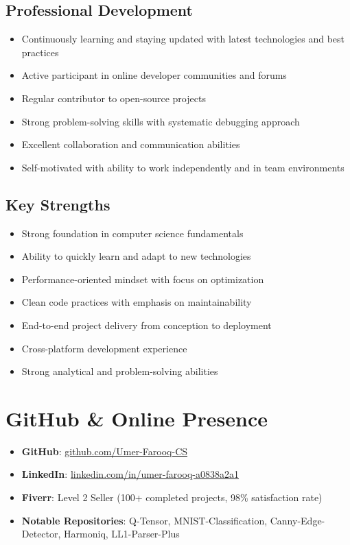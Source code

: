 \documentclass[a4paper,12pt]{article}
\begin{document}
\subsection*{Professional Development}
\begin{itemize}[nosep,after=\strut, leftmargin=1em, itemsep=1pt]
\item Continuously learning and staying updated with latest technologies and best practices
\item Active participant in online developer communities and forums
\item Regular contributor to open-source projects
\item Strong problem-solving skills with systematic debugging approach
\item Excellent collaboration and communication abilities
\item Self-motivated with ability to work independently and in team environments
\end{itemize}

\subsection*{Key Strengths}
\begin{itemize}[nosep,after=\strut, leftmargin=1em, itemsep=1pt]
\item Strong foundation in computer science fundamentals
\item Ability to quickly learn and adapt to new technologies
\item Performance-oriented mindset with focus on optimization
\item Clean code practices with emphasis on maintainability
\item End-to-end project delivery from conception to deployment
\item Cross-platform development experience
\item Strong analytical and problem-solving abilities
\end{itemize}

\section{GitHub \& Online Presence}

\begin{itemize}[nosep,after=\strut, leftmargin=1em, itemsep=1pt]
\item \textbf{GitHub}: \href{https://github.com/Umer-Farooq-CS}{github.com/Umer-Farooq-CS}
\item \textbf{LinkedIn}: \href{https://linkedin.com/in/umer-farooq-a0838a2a1}{linkedin.com/in/umer-farooq-a0838a2a1}
\item \textbf{Fiverr}: Level 2 Seller (100+ completed projects, 98\% satisfaction rate)
\item \textbf{Notable Repositories}: Q-Tensor, MNIST-Classification, Canny-Edge-Detector, Harmoniq, LL1-Parser-Plus
\end{itemize}
\end{document}
